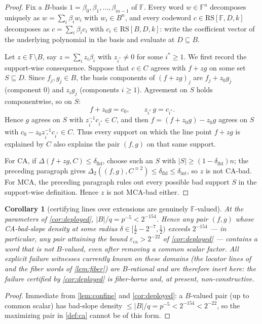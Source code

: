 \documentclass[11pt]{article}
\newtheorem{corollary}[theorem]{Corollary}
\theoremstyle{definition}
\theoremstyle{remark}
\newcommand{\F}{\mathbb{F}}
\newcommand{\B}{B}
\newcommand{\RS}{\mathrm{RS}}
\newcommand{\eca}{\varepsilon_{\mathrm{ca}}}
\newcommand{\dist}{\Delta}
\begin{document}
\begin{proof}
Fix a $\B$-basis $1=\beta_0,\beta_1,\dots,\beta_{m-1}$ of $\F$. Every word $w\in\F^n$ decomposes uniquely as $w=\sum_i\beta_i w_i$ with $w_i\in\B^n$, and every codeword $c\in\RS[\F,D,k]$ decomposes as $c=\sum_i\beta_i c_i$ with $c_i\in\RS[\B,D,k]$: write the coefficient vector of the underlying polynomial in the basis and evaluate at $D\subseteq\B$.

Let $z\in\F\setminus\B$, say $z=\sum_iz_i\beta_i$ with $z_{i^*}\ne0$ for some $i^*\ge1$. We first record the support-wise consequence. Suppose that $c\in C$ agrees with $f+zg$ on some set $S\subseteq D$. Since $f_j,g_j\in\B$, the basis components of $(f+zg)_j$ are $f_j+z_0g_j$ (component $0$) and $z_ig_j$ (components $i\ge1$). Agreement on $S$ holds componentwise, so on $S$:
\[
f+z_0g=c_0,\qquad z_{i^*}\,g=c_{i^*}.
\]
Hence $g$ agrees on $S$ with $z_{i^*}^{-1}c_{i^*}\in C$, and then $f=(f+z_0g)-z_0g$ agrees on $S$ with $c_0-z_0z_{i^*}^{-1}c_{i^*}\in C$. Thus every support on which the line point $f+zg$ is explained by $C$ also explains the pair $(f,g)$ on that same support.

For CA, if $\dist(f+zg,C)\le\delta_{\mathrm{fld}}$, choose such an $S$ with $|S|\ge(1-\delta_{\mathrm{fld}})n$; the preceding paragraph gives $\dist_2((f,g),C^{\equiv2})\le\delta_{\mathrm{fld}}\le\delta_{\mathrm{int}}$, so $z$ is not CA-bad. For MCA, the preceding paragraph rules out every possible bad support $S$ in the support-wise definition. Hence $z$ is not MCA-bad either.
\end{proof}

\begin{corollary}[certifying lines over extensions are genuinely $\F$-valued]\label{cor:Fvalued}
At the parameters of \cref{cor:deployed}, $|\B|/q=p^{-5}<2^{-154}$. Hence any pair $(f,g)$ whose CA-bad-slope density at some radius $\delta\in[\frac12-2^{-7},\frac12)$ exceeds $2^{-154}$ --- in particular, any pair attaining the bound $\eca>2^{-22}$ of \cref{cor:deployed} --- contains a word that is not $\B$-valued, even after removing a common scalar factor. All explicit failure witnesses currently known on these domains (the locator lines of \cite{Cho26a,Cho26b} and the fiber words of \cref{lem:fiber}) are $\B$-rational and are therefore inert here: the failure certified by \cref{cor:deployed} is fiber-borne and, at present, non-constructive.
\end{corollary}

\begin{proof}
Immediate from \cref{lem:confine} and \cref{cor:deployed}: a $\B$-valued pair (up to common scalar) has bad-slope density $\le|\B|/q=p^{-5}<2^{-154}<2^{-22}$, so the maximizing pair in \cref{def:ca} cannot be of this form.
\end{proof}
\end{document}
